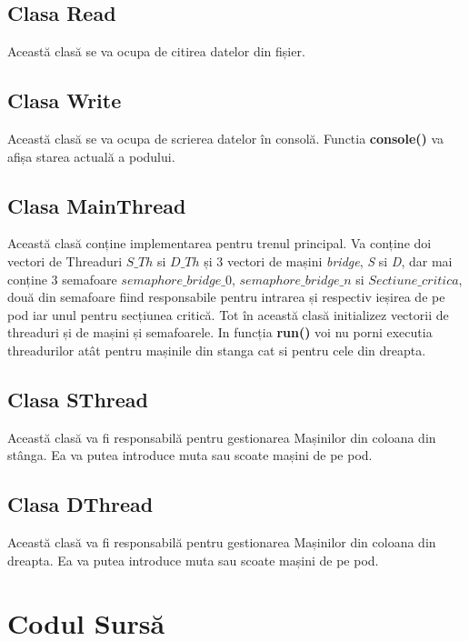 \documentclass{article}
\begin{document}
\subsection {Clasa Read}
\hspace{1em}
\justifying
Această clasă se va ocupa de citirea datelor din fișier.

\subsection {Clasa Write}
\hspace{1em}
\justifying
Această clasă se va ocupa de scrierea datelor în consolă. Functia \textbf{console()} va afișa starea actuală a podului.

\subsection {Clasa MainThread}
\hspace{1em}
\justifying
Această clasă conține implementarea pentru trenul principal. Va conține doi vectori de Threaduri $ S\_Th $ si $ D\_Th $ și 3 vectori de mașini \textit{bridge}, \textit{S} si \textit{D}, dar mai conține 3 semafoare $ semaphore\_bridge\_0 $, $ semaphore\_bridge\_n $ si $ Sectiune\_critica $, două din semafoare fiind responsabile pentru intrarea și respectiv ieșirea de pe pod iar unul pentru secțiunea critică. Tot în această clasă initializez vectorii de threaduri și de mașini și semafoarele. In funcția \textbf{run()} voi nu porni executia threadurilor atât pentru mașinile din stanga cat si pentru cele din dreapta.

\subsection {Clasa SThread}
\hspace{1em}
\justifying
Această clasă va fi responsabilă pentru gestionarea Mașinilor din coloana din stânga. Ea va putea introduce muta sau scoate mașini de pe pod.

\subsection {Clasa DThread}
\hspace{1em}
\justifying
Această clasă va fi responsabilă pentru gestionarea Mașinilor din coloana din dreapta. Ea va putea introduce muta sau scoate mașini de pe pod.


\newpage
\section{Codul Surs\u{a}}
\end{document}
